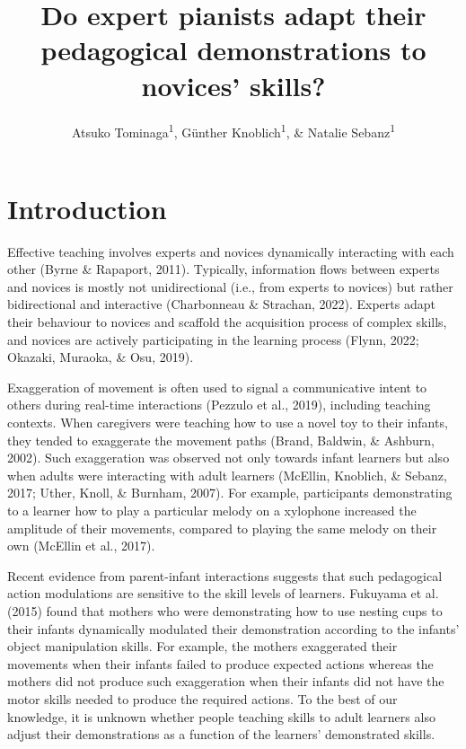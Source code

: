 \documentclass[
  man,floatsintext]{apa6}
\title{Do expert pianists adapt their pedagogical demonstrations to novices' skills?}
\author{Atsuko Tominaga\textsuperscript{1}, Günther Knoblich\textsuperscript{1}, \& Natalie Sebanz\textsuperscript{1}}
\date{}
\affiliation{\vspace{0.5cm}\textsuperscript{1} Department of Cognitive Science, Central European University}
\begin{document}
\maketitle

\hypertarget{introduction}{%
\section{Introduction}\label{introduction}}

Effective teaching involves experts and novices dynamically interacting with each other (Byrne \& Rapaport, 2011). Typically, information flows between experts and novices is mostly not unidirectional (i.e., from experts to novices) but rather bidirectional and interactive (Charbonneau \& Strachan, 2022). Experts adapt their behaviour to novices and scaffold the acquisition process of complex skills, and novices are actively participating in the learning process (Flynn, 2022; Okazaki, Muraoka, \& Osu, 2019).

Exaggeration of movement is often used to signal a communicative intent to others during real-time interactions (Pezzulo et al., 2019), including teaching contexts. When caregivers were teaching how to use a novel toy to their infants, they tended to exaggerate the movement paths (Brand, Baldwin, \& Ashburn, 2002). Such exaggeration was observed not only towards infant learners but also when adults were interacting with adult learners (McEllin, Knoblich, \& Sebanz, 2017; Uther, Knoll, \& Burnham, 2007). For example, participants demonstrating to a learner how to play a particular melody on a xylophone increased the amplitude of their movements, compared to playing the same melody on their own (McEllin et al., 2017).

Recent evidence from parent-infant interactions suggests that such pedagogical action modulations are sensitive to the skill levels of learners. Fukuyama et al. (2015) found that mothers who were demonstrating how to use nesting cups to their infants dynamically modulated their demonstration according to the infants' object manipulation skills. For example, the mothers exaggerated their movements when their infants failed to produce expected actions whereas the mothers did not produce such exaggeration when their infants did not have the motor skills needed to produce the required actions. To the best of our knowledge, it is unknown whether people teaching skills to adult learners also adjust their demonstrations as a function of the learners' demonstrated skills.
\end{document}
